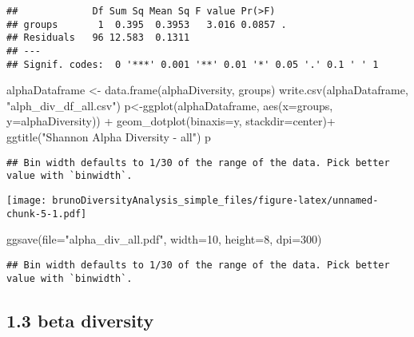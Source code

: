 \documentclass[
]{article}
\newenvironment{Shaded}{\begin{snugshade}}{\end{snugshade}}
\newcommand{\AttributeTok}[1]{\textcolor[rgb]{0.77,0.63,0.00}{#1}}
\newcommand{\DecValTok}[1]{\textcolor[rgb]{0.00,0.00,0.81}{#1}}
\newcommand{\FunctionTok}[1]{\textcolor[rgb]{0.00,0.00,0.00}{#1}}
\newcommand{\NormalTok}[1]{#1}
\newcommand{\OtherTok}[1]{\textcolor[rgb]{0.56,0.35,0.01}{#1}}
\newcommand{\SpecialCharTok}[1]{\textcolor[rgb]{0.00,0.00,0.00}{#1}}
\newcommand{\StringTok}[1]{\textcolor[rgb]{0.31,0.60,0.02}{#1}}
\begin{document}
\begin{verbatim}
##             Df Sum Sq Mean Sq F value Pr(>F)  
## groups       1  0.395  0.3953   3.016 0.0857 .
## Residuals   96 12.583  0.1311                 
## ---
## Signif. codes:  0 '***' 0.001 '**' 0.01 '*' 0.05 '.' 0.1 ' ' 1
\end{verbatim}

\begin{Shaded}
\begin{Highlighting}[]
\NormalTok{alphaDataframe }\OtherTok{\textless{}{-}} \FunctionTok{data.frame}\NormalTok{(alphaDiversity, groups)}
\FunctionTok{write.csv}\NormalTok{(alphaDataframe, }\StringTok{"alph\_div\_df\_all.csv"}\NormalTok{)}
\NormalTok{p}\OtherTok{\textless{}{-}}\FunctionTok{ggplot}\NormalTok{(alphaDataframe, }\FunctionTok{aes}\NormalTok{(}\AttributeTok{x=}\NormalTok{groups, }\AttributeTok{y=}\NormalTok{alphaDiversity)) }\SpecialCharTok{+} 
  \FunctionTok{geom\_dotplot}\NormalTok{(}\AttributeTok{binaxis=}\StringTok{\textquotesingle{}y\textquotesingle{}}\NormalTok{, }\AttributeTok{stackdir=}\StringTok{\textquotesingle{}center\textquotesingle{}}\NormalTok{)}\SpecialCharTok{+}
  \FunctionTok{ggtitle}\NormalTok{(}\StringTok{"Shannon Alpha Diversity {-} all"}\NormalTok{)}
\NormalTok{p}
\end{Highlighting}
\end{Shaded}

\begin{verbatim}
## Bin width defaults to 1/30 of the range of the data. Pick better value with `binwidth`.
\end{verbatim}

\texttt{[image: brunoDiversityAnalysis\_simple\_files/figure-latex/unnamed-chunk-5-1.pdf]}

\begin{Shaded}
\begin{Highlighting}[]
\FunctionTok{ggsave}\NormalTok{(}\AttributeTok{file=}\StringTok{"alpha\_div\_all.pdf"}\NormalTok{, }\AttributeTok{width=}\DecValTok{10}\NormalTok{, }\AttributeTok{height=}\DecValTok{8}\NormalTok{, }\AttributeTok{dpi=}\DecValTok{300}\NormalTok{)}
\end{Highlighting}
\end{Shaded}

\begin{verbatim}
## Bin width defaults to 1/30 of the range of the data. Pick better value with `binwidth`.
\end{verbatim}

\hypertarget{beta-diversity}{%
\subsection{1.3 beta diversity}\label{beta-diversity}}
\end{document}
